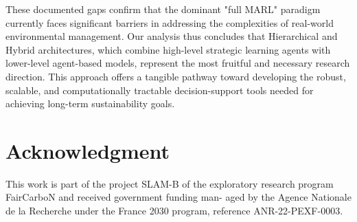 \documentclass[conference]{IEEEtran}
\begin{document}
These documented gaps confirm that the dominant "full MARL" paradigm currently faces significant barriers in addressing the complexities of real-world environmental management. Our analysis thus concludes that Hierarchical and Hybrid architectures, which combine high-level strategic learning agents with lower-level agent-based models, represent the most fruitful and necessary research direction. This approach offers a tangible pathway toward developing the robust, scalable, and computationally tractable decision-support tools needed for achieving long-term sustainability goals.

\section*{Acknowledgment}

This work is part of the project SLAM-B of the exploratory research program FairCarboN and received government funding man-
aged by the Agence Nationale de la Recherche under the France 2030 program, reference ANR-22-PEXF-0003.





\end{document}
